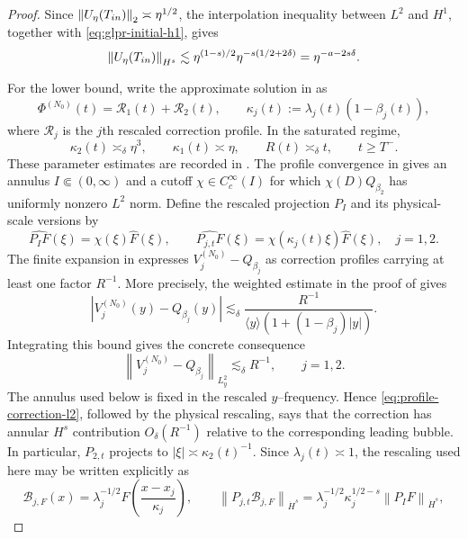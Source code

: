 \documentclass[10pt,a4paper]{amsart}
\numberwithin{equation}{section}
\newcommand{\norm}[1]{\left\lVert #1\right\rVert}
\begin{document}
\begin{proof}
Since $\norm{U_\eta(T_{\rm in})}_2\asymp\eta^{1/2}$,
the interpolation inequality between $L^2$ and $H^1$, together with
\eqref{eq:glpr-initial-h1}, gives
\[
 \norm{U_\eta(T_{\rm in})}_{H^s}
 \lesssim
 \eta^{(1-s)/2}
 \eta^{-s(1/2+2\delta)}
 =\eta^{-a-2s\delta}.
\]

For the lower bound, write the approximate solution in
\cite[Proposition~4.6]{GLPR} as
\[
 \Phi^{(N_0)}(t)=\mathcal R_1(t)+\mathcal R_2(t),\qquad
 \kappa_j(t):=\lambda_j(t)(1-\beta_j(t)),
\]
where $\mathcal R_j$ is the $j$th rescaled correction profile.  In the
saturated regime,
\[
 \kappa_2(t)\asymp_\delta\eta^3,\qquad
 \kappa_1(t)\asymp\eta,\qquad R(t)\asymp_\delta t,
 \qquad t\geq T^-.
\]
These parameter estimates are recorded in
\cite[Theorem~1.2 and Lemma~4.15]{GLPR}.
The profile convergence in \cite[Proposition~2.3]{GLPR} gives an annulus
$I\Subset(0,\infty)$ and a cutoff $\chi\in C_c^\infty(I)$ for which
$\chi(D)Q_{\beta_2}$ has uniformly nonzero $L^2$ norm.  Define the rescaled
projection $P_I$ and its physical-scale versions by
\[
 \widehat{P_IF}(\xi)=\chi(\xi)\widehat F(\xi),\qquad
 \widehat{P_{j,t}F}(\xi)=\chi(\kappa_j(t)\xi)\widehat F(\xi),
 \quad j=1,2.
\]
The finite expansion in \cite[Proposition~4.6]{GLPR} expresses
$V_j^{(N_0)}-Q_{\beta_j}$ as correction profiles carrying at least one factor
$R^{-1}$.  More precisely, the weighted estimate in the proof of
\cite[Corollary~4.7]{GLPR} gives
\[
 |V_j^{(N_0)}(y)-Q_{\beta_j}(y)|
 \lesssim_\delta
 \frac{R^{-1}}{\langle y\rangle(1+(1-\beta_j)|y|)}.
\]
Integrating this bound gives the concrete consequence
\begin{equation}\label{eq:profile-correction-l2}
 \norm{V_j^{(N_0)}-Q_{\beta_j}}_{L_y^2}
 \lesssim_\delta R^{-1},\qquad j=1,2.
\end{equation}
The annulus used below is fixed in the rescaled $y$--frequency.  Hence
\eqref{eq:profile-correction-l2}, followed by the physical rescaling, says
that the correction has annular $H^s$ contribution $O_\delta(R^{-1})$
relative to the corresponding leading bubble.  In particular, $P_{2,t}$
projects to $|\xi|\asymp\kappa_2(t)^{-1}$.  Since
$\lambda_j(t)\asymp1$, the rescaling used here may be written explicitly as
\begin{equation}\label{eq:annular-rescaling}
 \mathcal B_{j,F}(x)
 =\lambda_j^{-1/2}F\left(\frac{x-x_j}{\kappa_j}\right),
 \qquad
 \norm{P_{j,t}\mathcal B_{j,F}}_{\dot H^s}
 =\lambda_j^{-1/2}\kappa_j^{1/2-s}
 \norm{P_I F}_{\dot H^s},
\end{equation}

\end{proof}
\end{document}
